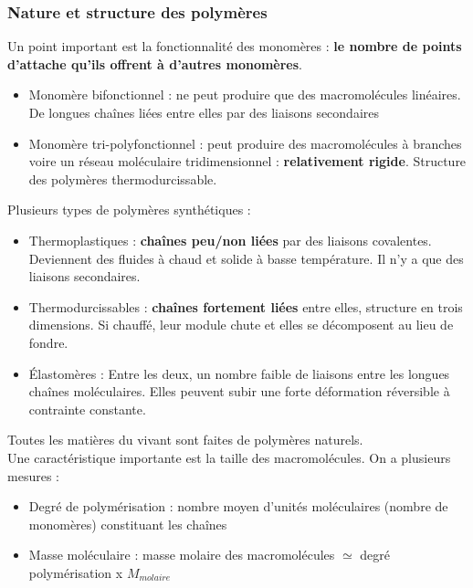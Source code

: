 \documentclass[../main.tex]{subfiles}
\begin{document}
\subsubsection{Nature et structure des polymères}
Un point important est la fonctionnalité des monomères : \textbf{le nombre de points d'attache qu'ils offrent à d'autres monomères}.\\

\begin{itemize}
    \item Monomère bifonctionnel : ne peut produire que des macromolécules linéaires. De longues chaînes liées entre elles par des liaisons secondaires\\
    \item Monomère tri-polyfonctionnel : peut produire des macromolécules à branches voire un réseau moléculaire tridimensionnel : \textbf{relativement rigide}. Structure des polymères thermodurcissable.\\
\end{itemize}

Plusieurs types de polymères synthétiques : \\
\begin{itemize}
    \item Thermoplastiques : \textbf{chaînes peu/non liées} par des liaisons covalentes. Deviennent des fluides à chaud et solide à basse température. Il n'y a que des liaisons secondaires.\\
    \item Thermodurcissables : \textbf{chaînes fortement liées} entre elles, structure en trois dimensions. Si chauffé, leur module chute et elles se décomposent au lieu de fondre.\\
    \item Élastomères : Entre les deux, un nombre faible de liaisons entre les longues chaînes moléculaires. Elles peuvent subir une forte déformation réversible à contrainte constante.\\
\end{itemize}
Toutes les matières du vivant sont faites de polymères naturels.\\

Une caractéristique importante est la taille des macromolécules. On a plusieurs mesures : \\
\begin{itemize}
    \item Degré de polymérisation : nombre moyen d'unités moléculaires (nombre de monomères) constituant les chaînes\\
    \item Masse moléculaire : masse molaire des macromolécules $\simeq$ degré polymérisation x $M_{molaire}$\\
\end{itemize}
\end{document}

